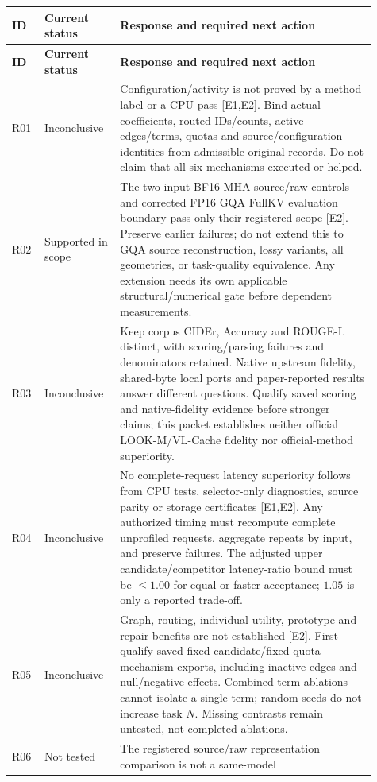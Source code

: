 \documentclass[10pt]{article}
\begin{document}
\small
\begin{longtable}{@{}p{0.07\linewidth}p{0.19\linewidth}p{0.65\linewidth}@{}}
\textbf{ID} & \textbf{Current status} & \textbf{Response and required next action}\\
\hline
\endfirsthead
\textbf{ID} & \textbf{Current status} & \textbf{Response and required next action}\\
\hline
\endhead
R01 & Inconclusive &
Configuration/activity is not proved by a method label or a CPU pass [E1,E2].
Bind actual coefficients, routed IDs/counts, active edges/terms, quotas and
source/configuration identities from admissible original records. Do not claim
that all six mechanisms executed or helped.\\[0.6em]
R02 & Supported in scope &
The two-input BF16 MHA source/raw controls and corrected FP16 GQA FullKV
evaluation boundary pass only their registered scope [E2]. Preserve earlier
failures; do not extend this to GQA source reconstruction, lossy variants,
all geometries, or task-quality equivalence. Any extension needs its own
applicable structural/numerical gate before dependent measurements.\\[0.6em]
R03 & Inconclusive &
Keep corpus CIDEr, Accuracy and ROUGE-L distinct, with scoring/parsing failures
and denominators retained. Native upstream fidelity, shared-byte local ports
and paper-reported results answer different questions. Qualify saved scoring
and native-fidelity evidence before stronger claims; this packet establishes
neither official LOOK-M/VL-Cache fidelity nor official-method superiority.\\[0.6em]
R04 & Inconclusive &
No complete-request latency superiority follows from CPU tests, selector-only
diagnostics, source parity or storage certificates [E1,E2]. Any authorized
timing must recompute complete unprofiled requests, aggregate repeats by input,
and preserve failures. The adjusted upper candidate/competitor latency-ratio
bound must be $\leq1.00$ for equal-or-faster acceptance; $1.05$ is only a
reported trade-off.\\[0.6em]
R05 & Inconclusive &
Graph, routing, individual utility, prototype and repair benefits are not
established [E2]. First qualify saved fixed-candidate/fixed-quota mechanism
exports, including inactive edges and null/negative effects. Combined-term
ablations cannot isolate a single term; random seeds do not increase task $N$.
Missing contrasts remain untested, not completed ablations.\\[0.6em]
R06 & Not tested &
The registered source/raw representation comparison is not a same-model

\end{longtable}
\end{document}
